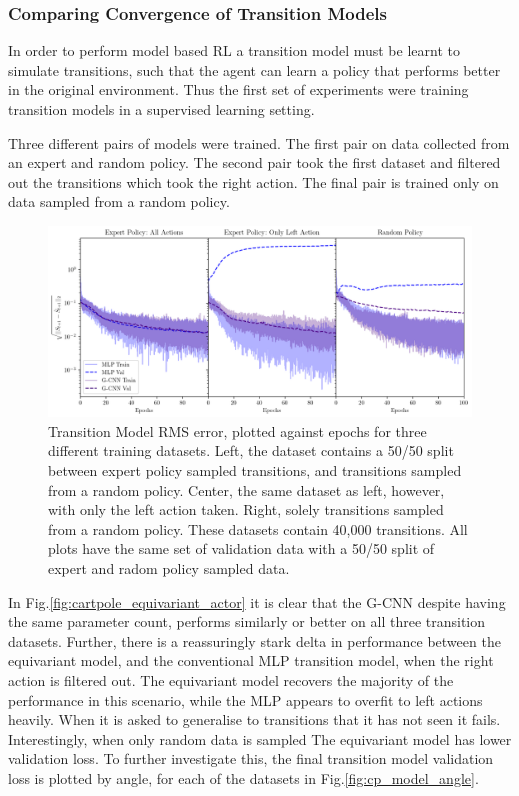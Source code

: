 \subsubsection{Comparing Convergence of Transition Models}
In order to perform model based RL a transition model must be learnt to simulate transitions, such that the agent can learn a policy that performs better in the original environment. Thus the first set of experiments were training transition models in a supervised learning setting.

Three different pairs of models were trained. The first pair on data collected from an expert and random policy. The second pair took the first dataset and filtered out the transitions which took the right action. The final pair is trained only on data sampled from a random policy.
\begin{figure}
	\centering
	\includegraphics*[width=\linewidth]{Figures/transition_model_cp.png}
	\caption{Transition Model RMS error, plotted against epochs for three different training datasets. Left, the dataset contains a 50/50 split between expert policy sampled transitions, and transitions sampled from a random policy. Center, the same dataset as left, however, with only the left action taken. Right, solely transitions sampled from a random policy. These datasets contain 40,000 transitions. All plots have the same set of validation data with a 50/50 split of expert and radom policy sampled data.}
	\label{fig:transition_model_cp}
\end{figure}
In Fig.\ref{fig:cartpole_equivariant_actor} it is clear that the G-CNN despite having the same parameter count, performs similarly or better on all three transition datasets. Further, there is a reassuringly stark delta in performance between the equivariant model, and the conventional MLP transition model, when the right action is filtered out. The equivariant model recovers the majority of the performance in this scenario, while the MLP appears to overfit to left actions heavily. When it is asked to generalise to transitions that it has not seen it fails. Interestingly, when only random data is sampled The equivariant model has lower validation loss. To further investigate this, the final transition model validation loss is plotted by angle, for each of the datasets in Fig.\ref{fig:cp_model_angle}.

